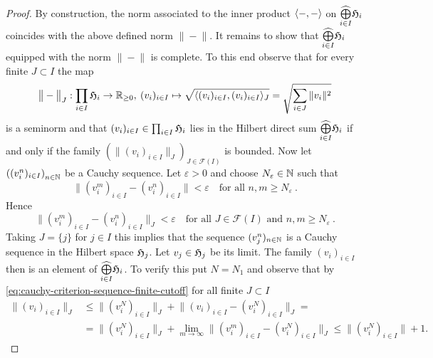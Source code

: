 \begin{proof}
  By construction, the norm associated to the inner product $\langle -,- \rangle $ on
  $\widehat{\bigoplus\limits_{i\in I}} \mathfrak{H}_i$ coincides with the above defined norm $\big\|-\big\|$.
  It remains to show that $\widehat{\bigoplus\limits_{i\in I}} \mathfrak{H}_i$ equipped with the norm
  $\big\|-\big\|$ is complete. To this end observe that for every finite $J\subset I$ the map
  \[
    \big\| - \big\|_J : \prod_{i\in I} \mathfrak{H}_i \to \mathbb{R}_{\geq 0}, \:
    (v_i)_{i\in I} \mapsto \sqrt{\langle (v_i)_{i\in I},(v_i)_{i\in I} \rangle_J}
    = \sqrt{\sum_{i\in J} \| v_i \|^2}
  \]
  is a seminorm and that $(v_i)_{i\in I} \in \prod_{i\in I} \mathfrak{H}_i$ lies in
  the Hilbert direct sum $\widehat{\bigoplus\limits_{i\in I}} \mathfrak{H}_i$ if and only if the
  family $\left(\big\| (v_i)_{i\in I}  \big\|_J\right)_{J\in \mathscr{F}(I)}$ is bounded. 
  Now let $\left((v_i^n)_{i\in I} \right)_{n\in \mathbb{N}}$ be a Cauchy sequence.
  Let $\varepsilon >0$ and choose $N_\varepsilon \in \mathbb{N}$ such that 
  \begin{equation}
    \label{eq:cauchy-criterion-sequence-hilbert-direct-sum}
    \big\| (v_i^m)_{i\in I} - (v_i^n)_{i\in I} \big\| < \varepsilon \quad
    \text{for all } n,m\geq N_\varepsilon \ .
  \end{equation}
  Hence
  \begin{equation}
    \label{eq:cauchy-criterion-sequence-finite-cutoff}
    \big\| (v_i^m)_{i\in I} - (v_i^n)_{i\in I} \big\|_J <    \varepsilon \quad
    \text{for all } J\in \mathscr{F}(I) \text{ and }  n,m\geq N_\varepsilon \ . 
  \end{equation}
  Taking $J =\{ j\}$ for $j\in I$ this implies that the sequence
  $ (v_j^n)_{n\in \mathbb{N}}$ is a Cauchy sequence in the Hilbert space $\mathfrak{H}_j$. 
  Let $v_j \in \mathfrak{H}_j$ be its limit. The family $(v_i)_{i\in I}$ then is
  an element of $\widehat{\bigoplus\limits_{i\in I}} \mathfrak{H}_i$. To verify this
  put $N=N_1$ and observe that by \eqref{eq:cauchy-criterion-sequence-finite-cutoff}
  for all finite $J\subset I$
  \begin{equation*}
    \begin{split}
    \big\| (v_i)_{i\in I} \big\|_J & \leq
    \big\| (v_i^N)_{i\in I} \big\|_J + \big\| (v_i)_{i\in I} - (v_i^N)_{i\in I} \big\|_J = \\
    & = \big\| (v_i^N)_{i\in I} \big\|_J + \lim_{m\to \infty} \big\| (v_i^m)_{i\in I} - (v_i^N)_{i\in I} \big\|_J
    \leq \big\| (v_i^N)_{i\in I} \big\| + 1.
    \end{split}
  \end{equation*}
    

\end{proof}
